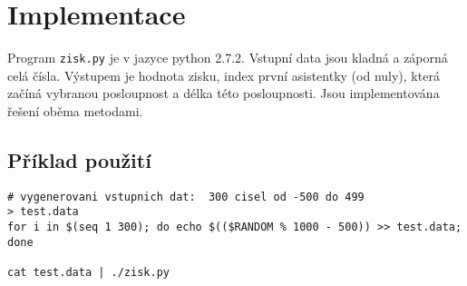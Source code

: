 \documentclass[11pt]{article}
\begin{document}
\section{Implementace}
Program {\tt zisk.py} je v jazyce python 2.7.2. Vstupní data jsou kladná 
a záporná celá čísla. Výstupem je hodnota zisku, index první asistentky 
(od nuly), která začíná vybranou posloupnost a délka této posloupnosti. Jsou 
implementována řešení oběma metodami.

\subsection{Příklad použití}
\begin{verbatim}
# vygenerovani vstupnich dat:  300 cisel od -500 do 499
> test.data
for i in $(seq 1 300); do echo $(($RANDOM % 1000 - 500)) >> test.data; done

cat test.data | ./zisk.py
\end{verbatim}
\end{document}
